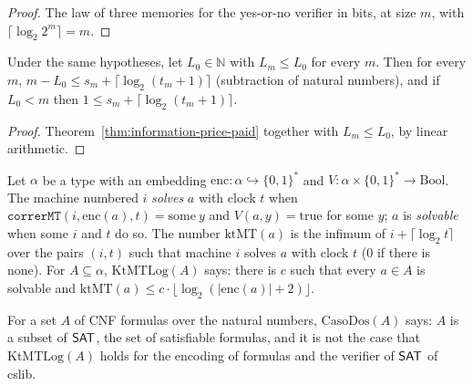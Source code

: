 \begin{proof}
  \leanok
  The law of three memories for the yes-or-no verifier in bits, at size $m$, with
  $\lceil \log_2 2^m \rceil = m$.
\end{proof}

\begin{theorem}
  \label{thm:information-once-not-enough}
  \leanok
  Under the same hypotheses, let $L_0 \in \mathbb{N}$ with $L_m \le L_0$ for every $m$. Then for
  every $m$, $m - L_0 \le s_m + \lceil \log_2 (t_m + 1) \rceil$ (subtraction of natural numbers),
  and if $L_0 < m$ then $1 \le s_m + \lceil \log_2 (t_m + 1) \rceil$.
  \own{}
\end{theorem}

\begin{proof}
  \leanok
  Theorem~\ref{thm:information-price-paid} together with $L_m \le L_0$, by linear arithmetic.
\end{proof}

\begin{definition}
  \label{def:information-ktmt-log}
  \leanok
  Let $\alpha$ be a type with an embedding $\mathrm{enc} : \alpha \hookrightarrow \{0,1\}^*$ and
  $V : \alpha \times \{0,1\}^* \to \mathrm{Bool}$. The machine numbered $i$ \emph{solves} $a$ with
  clock $t$ when $\texttt{correrMT}(i, \mathrm{enc}(a), t) = \mathrm{some}\ y$ and
  $V(a, y) = \mathrm{true}$ for some $y$; $a$ is \emph{solvable} when some $i$ and $t$ do so. The
  number $\mathrm{ktMT}(a)$ is the infimum of $i + \lceil \log_2 t \rceil$ over the pairs $(i, t)$
  such that machine $i$ solves $a$ with clock $t$ ($0$ if there is none). For $A \subseteq \alpha$,
  $\mathrm{KtMTLog}(A)$ says: there is $c$ such that every $a \in A$ is solvable and
  $\mathrm{ktMT}(a) \le c \cdot \lfloor \log_2 (|\mathrm{enc}(a)| + 2) \rfloor$.
  \own{}
\end{definition}

\begin{definition}
  \label{def:information-case-two}
  \leanok
  For a set $A$ of CNF formulas over the natural numbers, $\mathrm{CasoDos}(A)$ says: $A$ is a
  subset of $\mathsf{SAT}$, the set of satisfiable formulas, and it is not the case that
  $\mathrm{KtMTLog}(A)$ holds for the encoding of formulas and the verifier of $\mathsf{SAT}$ of cslib.
  \own{}
\end{definition}

